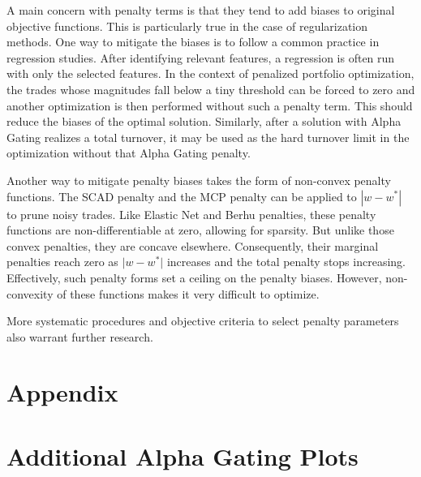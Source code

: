 \documentclass[11pt, letterpaper]{article}
\begin{document}
A main concern with penalty terms is that they tend to add biases to original objective functions. This is particularly true in
the case of regularization methods. One way to mitigate the biases is to follow a common practice in regression studies. After
identifying relevant features, a regression is often run with only the selected features. In the context of penalized portfolio
optimization, the trades whose magnitudes fall below a tiny threshold can be forced to zero and another optimization is then
performed without such a penalty term. This should reduce the biases of the optimal solution. Similarly, after a solution with
Alpha Gating realizes a total turnover, it may be used as the hard turnover limit in the optimization without that Alpha Gating
penalty.

Another way to mitigate penalty biases takes the form of non-convex penalty functions. The SCAD penalty \cite{fan2001variable}
and the MCP penalty \cite{zhang2010nearly} can be applied to $|w - w^*|$ to prune noisy trades. Like Elastic Net and Berhu
penalties, these penalty functions are non-differentiable at zero, allowing for sparsity. But unlike those convex penalties,
they are concave elsewhere. Consequently, their marginal penalties reach zero as $\lvert w - w^* \rvert$ increases and the total
penalty stops increasing. Effectively, such penalty forms set a ceiling on the penalty biases. However, non-convexity of these
functions makes it very difficult to optimize.

More systematic procedures and objective criteria to select penalty parameters also warrant further research.

\newpage
\section*{Appendix}
\appendix
\section{Additional Alpha Gating Plots}
\end{document}

